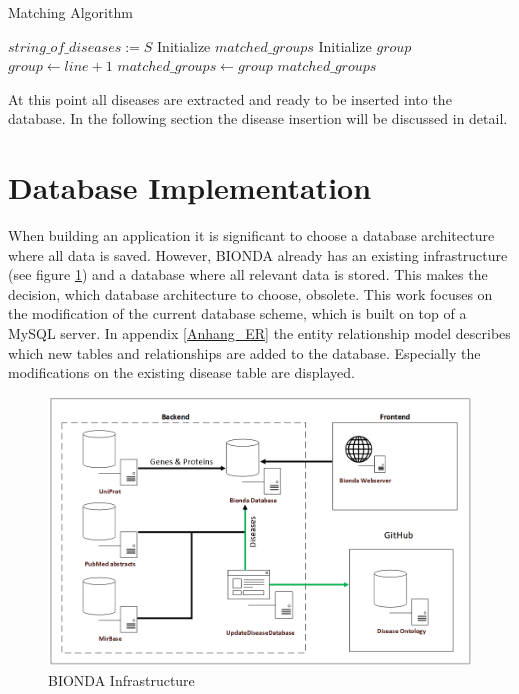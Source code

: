 \begin{algorithm}[H]
\caption{Matching Algorithm}
\begin{algorithmic}[1]
\Require $string\_of\_diseases := S$
\State Initialize $ matched\_groups$
\State Initialize $ group $
    	\State $group \gets line + 1$
	\EndIf
\EndIf
{}
    	\State $matched\_groups \gets group$
	\EndIf
\EndIf
\EndFor
\Return $matched\_groups$
\end{algorithmic}
\end{algorithm}

At this point all diseases are extracted and ready to be inserted into the database. In the following section the disease insertion will be discussed in detail.


\section{Database Implementation}
\label{methods_database}
When building an application it is significant to choose a database architecture where all data is saved. However, \ac{BIONDA} already has an existing infrastructure (see figure \ref{bionda_structure}) and a database where all relevant data is stored. This makes the decision, which database architecture to choose, obsolete. This work focuses on the modification of the current database scheme, which is built on top of a MySQL server. In appendix \ref{Anhang_ER} the entity relationship model describes which new tables and relationships are added to the database. Especially the modifications on the existing disease table are displayed.

\begin{figure}[H]
\centering
\includegraphics[scale=0.4]{bilder/Sollkonzept.png}
\caption{BIONDA Infrastructure}
\label{bionda_structure}
\end{figure}

